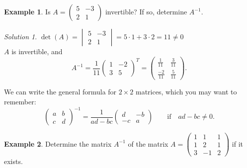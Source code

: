 \documentclass[
  12pt,
  oneside]{book}
\theoremstyle{definition}
\theoremstyle{definition}
\newtheorem{example}{Example}[chapter]
\theoremstyle{definition}
\theoremstyle{definition}
\theoremstyle{remark}
\newtheorem*{solution}{Solution}
\begin{document}
\begin{example}
Is \(A=\begin{pmatrix}5&-3\\2&1\end{pmatrix}\) invertible? If so, determine \(A^{-1}\).
\end{example}

\begin{solution}
\(\det(A)=\begin{vmatrix}5&-3\\2&1\end{vmatrix}=5\cdot1+3\cdot2=11\neq0\)\\
\(A\) is invertible, and
\[
A^{-1} = \frac{1}{11}\begin{pmatrix}1&-2\\3&5\end{pmatrix}^T
= \begin{pmatrix}\frac{1}{11}&\frac{3}{11}\\\frac{-2}{11}&\frac{5}{11}\end{pmatrix}.
\]
\end{solution}

We can write the general formula for \(2\times 2\) matrices, which you may want to remember:
\[
\begin{pmatrix}a&b\\c&d\end{pmatrix}^{-1} = \frac{1}{ad-bc} \begin{pmatrix}d&-b\\-c&a\end{pmatrix}\quad\quad
\text{if}\quad ad-bc\neq0.
\]

\begin{example}
Determine the matrix \(A^{-1}\) of the matrix \(A=\begin{pmatrix}1&1&1\\1&2&1\\3&-1&2\end{pmatrix}\) if it exists.
\end{example}
\end{document}
